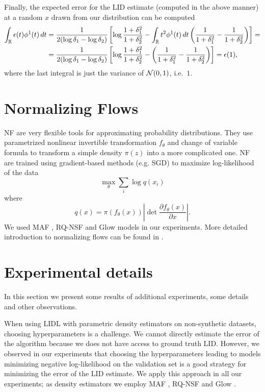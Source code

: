 Finally, the expected error for the LID estimate (computed in the above manner) at a random $x$ drawn from our distribution can be computed
\begin{equation}
\begin{split}
    \int_{\mathbb{R}} \epsilon(t)\phi^1(t) \,dt 
    & = \frac{1}{2(\log\delta_1 - \log\delta_2)}
            \left[ \log\frac{1+\delta_1^2}{1+\delta_2^2}
            - \int_{\mathbb{R}} t^2 \phi^1(t) \,dt\left( \frac{1}{1+\delta_1^2} - \frac{1}{1+\delta_2^2} \right)\right] = \\
    & = \frac{1}{2(\log\delta_1 - \log\delta_2)}
            \left[ \log\frac{1+\delta_1^2}{1+\delta_2^2}
            - \left( \frac{1}{1+\delta_1^2} - \frac{1}{1+\delta_2^2} \right)\right] 
    = \epsilon(1),
\end{split}
\end{equation}
where the last integral is just the variance of $\mathcal{N}(0,1)$, i.e.\ $1$.

\section{Normalizing Flows}
\label{sec:nf}

NF are very flexible tools for approximating probability distributions. They use parametrized nonlinear invertible transformation $f_\theta$ and change of variable formula to transform a simple density $\pi(z)$ into a more complicated one. NF are trained using gradient-based methods (e.g. SGD) to maximize log-likelihood of the data
$$\max_\theta \sum_{i}\log q(x_i)$$
where
$$q(x) = \pi(f_\theta(x))\left|\det\frac{\partial f_\theta(x)}{\partial x}\right|.$$
We used MAF \citep{papamakarios2017masked}, RQ-NSF \citep{durkan2019neural} and Glow \citep{kingma2018glow} models in our experiments. More detailed introduction to normalizing flows can be found in \cite{dinh2014nice}.




\section{Experimental details}
\label{sec:exp-details}

In this section we present some results of additional experiments, some details and other observations. 

When using LIDL with parametric density estimators on non-synthetic datasets, choosing hyperparameters is a challenge. We cannot directly estimate the error of the algorithm because we does not have access to ground truth LID. However, we observed in our experiments that choosing the hyperparameters leading to models minimizing negative log-likelihood on the validation set is a good strategy for minimizing the error of the LID estimate. We apply this approach in all our experiments; as density estimators we employ MAF \citep{papamakarios2017masked}, RQ-NSF \citep{durkan2019neural} and Glow \citep{kingma2018glow}.

